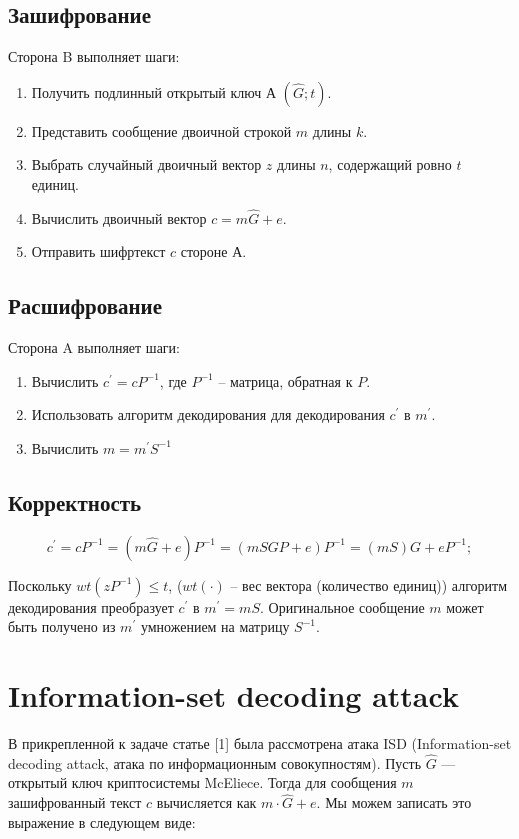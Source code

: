 \documentclass[12pt,a4paper]{scrartcl}
\begin{document}
\subsection{Зашифрование}

Сторона B выполняет шаги:

\begin{enumerate}
	\item Получить подлинный открытый ключ А $(\hat{G};t)$.
	\item Представить сообщение двоичной строкой $m$ длины $k$.
	\item Выбрать случайный двоичный вектор $z$ длины $n$, содержащий ровно $t$ единиц.
	\item Вычислить двоичный вектор $c=m\hat{G}+e$.
	\item Отправить шифртекст $c$ стороне А. 
\end{enumerate}

\subsection{Расшифрование}

Сторона A выполняет шаги:

\begin{enumerate}
	\item Вычислить $c^{\prime} = cP^{-1}$, где $P^{-1}$ -- матрица, обратная к $P$.
	\item Использовать алгоритм декодирования для декодирования $c^{\prime}$ в $m^{\prime}$.
	\item Вычислить $m=m^{\prime}S^{-1}$
\end{enumerate}

\subsection{Корректность}

$$c^{\prime} = cP^{-1}=(m\hat{G}+e)P^{-1}=(mSGP+e)P^{-1}=(mS)G+eP^{-1};$$

Поскольку $wt(zP^{-1})\leq t$, ($wt(\cdot)$ -- вес вектора (количество единиц)) алгоритм декодирования преобразует $c^{\prime}$ в $m^{\prime}=mS$. Оригинальное сообщение $m$ может быть получено из $m^{\prime}$ умножением на матрицу $S^{-1}$.

\section{Information-set decoding attack}

В прикрепленной к задаче статье [1] была рассмотрена атака ISD (Information-set decoding attack, атака по информационным совокупностям). Пусть $\hat{G}$ — открытый ключ криптосистемы McEliece. Тогда для сообщения $m$ зашифрованный текст $c$ вычисляется как $m \cdot \hat{G} + e$. Мы можем записать это выражение в следующем виде:
\end{document}
